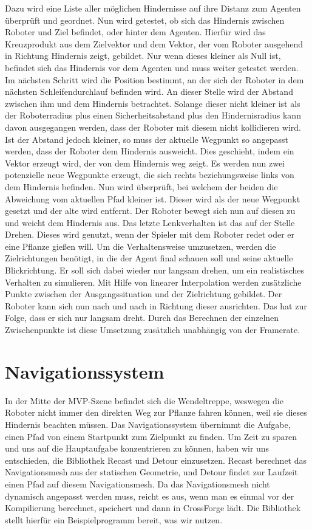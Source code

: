 Dazu wird eine Liste aller möglichen Hindernisse auf ihre Distanz zum Agenten überprüft und geordnet. Nun wird getestet, ob sich das Hindernis zwischen Roboter und Ziel befindet, oder hinter dem Agenten. Hierfür wird das Kreuzprodukt aus dem Zielvektor und dem Vektor, der vom Roboter ausgehend in Richtung Hindernis zeigt, gebildet. Nur wenn dieses kleiner als Null ist, befindet sich das Hindernis vor dem Agenten und muss weiter getestet werden. Im nächsten Schritt wird die Position bestimmt, an der sich der Roboter in dem nächsten Schleifendurchlauf befinden wird. An dieser Stelle wird der Abstand zwischen ihm und dem Hindernis betrachtet. Solange dieser nicht kleiner ist als der Roboterradius plus einen Sicherheitsabstand plus den Hindernisradius kann davon ausgegangen werden, dass der Roboter mit diesem nicht kollidieren wird. Ist der Abstand jedoch kleiner, so muss der aktuelle Wegpunkt so angepasst werden, dass der Roboter dem Hindernis ausweicht. Dies geschieht, indem ein Vektor erzeugt wird, der von dem Hindernis weg zeigt. Es werden nun zwei potenzielle neue Wegpunkte erzeugt, die sich rechts beziehungsweise links von dem Hindernis befinden. Nun wird überprüft, bei welchem der beiden die Abweichung vom aktuellen Pfad kleiner ist. Dieser wird als der neue Wegpunkt gesetzt und der alte wird entfernt. Der Roboter bewegt sich nun auf diesen zu und weicht dem Hindernis aus.
Das letzte Lenkverhalten ist das auf der Stelle Drehen. Dieses wird genutzt, wenn der Spieler mit dem Roboter redet oder er eine Pflanze gießen will. Um die Verhaltensweise umzusetzen, werden die Zielrichtungen benötigt, in die der Agent final schauen soll und seine aktuelle Blickrichtung. Er soll sich dabei wieder nur langsam drehen, um ein realistisches Verhalten zu simulieren. Mit Hilfe von linearer Interpolation werden zusätzliche Punkte zwischen der Ausgangssituation und der Zielrichtung gebildet. Der Roboter kann sich nun nach und nach in Richtung dieser ausrichten. Das hat zur Folge, dass er sich nur langsam dreht. Durch das Berechnen der einzelnen Zwischenpunkte ist diese Umsetzung zusätzlich unabhängig von der Framerate.

\section{Navigationssystem}

In der Mitte der MVP-Szene befindet sich die Wendeltreppe, weswegen die Roboter nicht immer den direkten Weg zur Pflanze fahren können, weil sie dieses Hindernis beachten müssen. Das Navigationssystem übernimmt die Aufgabe, einen Pfad von einem Startpunkt zum Zielpunkt zu finden. Um Zeit zu sparen und uns auf die Hauptaufgabe konzentrieren zu können, haben wir uns entschieden, die Bibliothek Recast und Detour einzusetzen. Recast berechnet das Navigationsmesh aus der statischen Geometrie, und Detour findet zur Laufzeit einen Pfad auf diesem Navigationsmesh. Da das Navigationsmesh nicht dynamisch angepasst werden muss, reicht es aus, wenn man es einmal vor der Kompilierung berechnet, speichert und dann in CrossForge lädt. Die Bibliothek stellt hierfür ein Beispielprogramm bereit, was wir nutzen.

